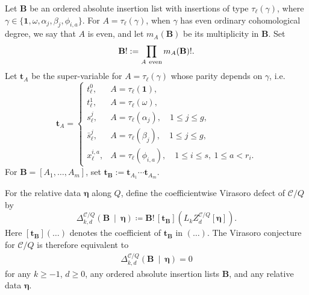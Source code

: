 \documentclass[letterpaper,12pt]{amsart}
\theoremstyle{definition}
\newcommand{\id}{\mathbf 1}
\numberwithin{equation}{section}
\begin{document}
Let $\mathbf B$ be an ordered absolute insertion list with insertions of type $\tau_\ell(\gamma)$, where $\gamma\in\{\id,\omega,\alpha_j,\beta_j,\phi_{i,a}\}$.  For
\(A=\tau_\ell(\gamma)\), when \(\gamma\) has even ordinary cohomological
degree, we say that \(A\) is even, and let \(m_A(\mathbf B)\)
be its multiplicity in \(\mathbf B\). Set
\[
\mathbf B!
:=
\prod_{A\ {\rm even}}m_A(\mathbf B)!.
\]
Let $\mathbf t_A$ be the super-variable for \(A=\tau_\ell(\gamma)\) whose parity depends on $\gamma$, i.e.
\[
\mathbf t_A=
\begin{cases}
t^0_\ell,&A=\tau_\ell(\id),\\
t^1_\ell,&A=\tau_\ell(\omega),\\
s^j_\ell,&A=\tau_\ell(\alpha_j),\quad 1\leq j\leq g,\\
\bar s^j_\ell,&A=\tau_\ell(\beta_j),\quad 1\leq j\leq g,\\
x^{i,a}_\ell,&A=\tau_\ell(\phi_{i,a}),\quad 1\leq i\leq s,\ 1\leq a<r_i.
\end{cases}
\]
For $\mathbf B=[A_1,\dots,A_m]$, set $\mathbf t_\mathbf B:=\mathbf t_{A_1}\cdots\mathbf t_{A_m}$.

For the relative data \(\boldsymbol\eta\) along \(Q\), define the coefficientwise
Virasoro defect of \(\mathcal{C}/Q\) by
\[
\Delta_{k,d}^{\mathcal{C}/Q}
\left(
\mathbf B
\ \middle|\
\boldsymbol\eta
\right)
\coloneqq
\mathbf B!\,
\left[\mathbf t_{\mathbf B}\right]
\left(L_kZ_d^{\mathcal{C}/Q}[\boldsymbol\eta]\right).
\]
Here \([\mathbf t_{\mathbf B}](\dots)\) denotes the coefficient of $\mathbf t_{\mathbf B}$ in \((\dots)\).
The Virasoro conjecture for \(\mathcal{C}/Q\) is therefore equivalent to
\begin{align}\label{formula-virasorodefect}
\Delta_{k,d}^{\mathcal{C}/Q}
\left(\mathbf B\ \middle|\ \boldsymbol\eta\right)=0
\end{align}
for any \(k\geq-1\), \(d\geq0\), any ordered absolute insertion lists
\(\mathbf B\), and any relative data \(\boldsymbol\eta\).
\end{document}
